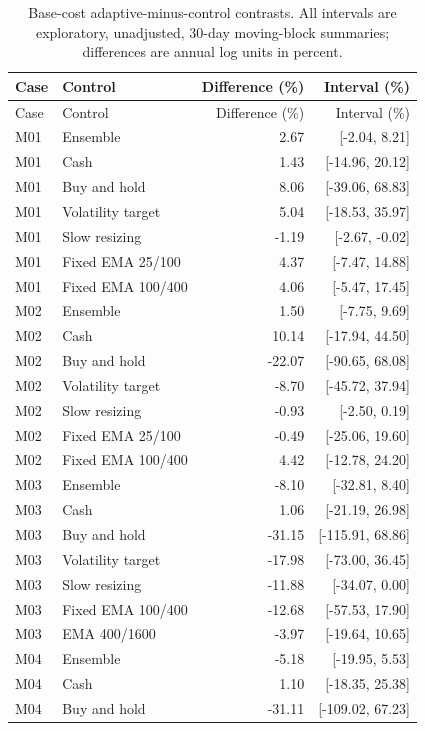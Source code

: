 \begingroup\small\begin{longtable}{llrr}
\caption{Base-cost adaptive-minus-control contrasts. All intervals are exploratory, unadjusted, 30-day moving-block summaries; differences are annual log units in percent.}\\
\toprule Case & Control & Difference (\%) & Interval (\%)\\\midrule\endfirsthead
\toprule Case & Control & Difference (\%) & Interval (\%)\\\midrule\endhead
M01 & Ensemble & 2.67 & [-2.04, 8.21]\\
M01 & Cash & 1.43 & [-14.96, 20.12]\\
M01 & Buy and hold & 8.06 & [-39.06, 68.83]\\
M01 & Volatility target & 5.04 & [-18.53, 35.97]\\
M01 & Slow resizing & -1.19 & [-2.67, -0.02]\\
M01 & Fixed EMA 25/100 & 4.37 & [-7.47, 14.88]\\
M01 & Fixed EMA 100/400 & 4.06 & [-5.47, 17.45]\\
M02 & Ensemble & 1.50 & [-7.75, 9.69]\\
M02 & Cash & 10.14 & [-17.94, 44.50]\\
M02 & Buy and hold & -22.07 & [-90.65, 68.08]\\
M02 & Volatility target & -8.70 & [-45.72, 37.94]\\
M02 & Slow resizing & -0.93 & [-2.50, 0.19]\\
M02 & Fixed EMA 25/100 & -0.49 & [-25.06, 19.60]\\
M02 & Fixed EMA 100/400 & 4.42 & [-12.78, 24.20]\\
M03 & Ensemble & -8.10 & [-32.81, 8.40]\\
M03 & Cash & 1.06 & [-21.19, 26.98]\\
M03 & Buy and hold & -31.15 & [-115.91, 68.86]\\
M03 & Volatility target & -17.98 & [-73.00, 36.45]\\
M03 & Slow resizing & -11.88 & [-34.07, 0.00]\\
M03 & Fixed EMA 100/400 & -12.68 & [-57.53, 17.90]\\
M03 & EMA 400/1600 & -3.97 & [-19.64, 10.65]\\
M04 & Ensemble & -5.18 & [-19.95, 5.53]\\
M04 & Cash & 1.10 & [-18.35, 25.38]\\
M04 & Buy and hold & -31.11 & [-109.02, 67.23]\\

\end{longtable}
